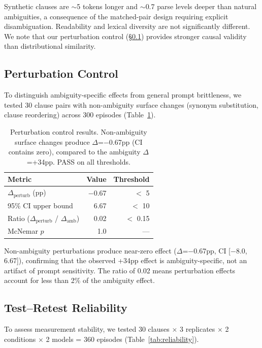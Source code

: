 \documentclass[11pt]{article}
\begin{document}
Synthetic clauses are $\sim$5 tokens longer and $\sim$0.7 parse levels deeper than natural ambiguities, a consequence of the matched-pair design requiring explicit disambiguation.
Readability and lexical diversity are not significantly different.
We note that our perturbation control (\S\ref{sec:perturbation}) provides stronger causal validity than distributional similarity.

\subsection{Perturbation Control}
\label{sec:perturbation}

To distinguish ambiguity-specific effects from general prompt brittleness, we tested 30 clause pairs with non-ambiguity surface changes (synonym substitution, clause reordering) across 300 episodes (Table~\ref{tab:perturbation}).

\begin{table}[t]
\centering
\small
\begin{tabular}{lrr}
\toprule
\textbf{Metric} & \textbf{Value} & \textbf{Threshold} \\
\midrule
$\Delta_\text{perturb}$ (pp) & $-$0.67 & $<$ 5 \\
95\% CI upper bound & 6.67 & $<$ 10 \\
Ratio ($\Delta_\text{perturb}$ / $\Delta_\text{amb}$) & 0.02 & $<$ 0.15 \\
McNemar $p$ & 1.0 & --- \\
\bottomrule
\end{tabular}
\caption{Perturbation control results. Non-ambiguity surface changes produce $\Delta$=$-$0.67pp (CI contains zero), compared to the ambiguity $\Delta$=+34pp. PASS on all thresholds.}
\label{tab:perturbation}
\end{table}

Non-ambiguity perturbations produce near-zero effect ($\Delta$=$-$0.67pp, CI [$-$8.0, 6.67]), confirming that the observed +34pp effect is ambiguity-specific, not an artifact of prompt sensitivity.
The ratio of 0.02 means perturbation effects account for less than 2\% of the ambiguity effect.

\subsection{Test--Retest Reliability}
\label{sec:reliability}

To assess measurement stability, we tested 30 clauses $\times$ 3 replicates $\times$ 2 conditions $\times$ 2 models = 360 episodes (Table~\ref{tab:reliability}).
\end{document}
